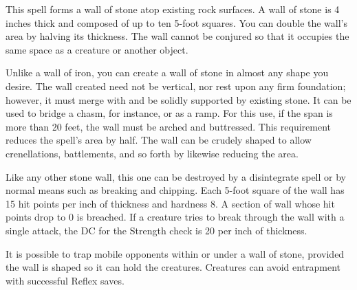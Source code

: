 \spellrng{\rngmed}
\begin{spelleffect}
  This spell forms a wall of stone atop existing rock surfaces. A wall of stone is 4 inches thick and composed of up to ten 5-foot squares. You can double the wall's area by halving its thickness. The wall cannot be conjured so that it occupies the same space as a creature or another object.
  \par Unlike a wall of iron, you can create a wall of stone in almost any shape you desire. The wall created need not be vertical, nor rest upon any firm foundation; however, it must merge with and be solidly supported by existing stone. It can be used to bridge a chasm, for instance, or as a ramp. For this use, if the span is more than 20 feet, the wall must be arched and buttressed. This requirement reduces the spell's area by half. The wall can be crudely shaped to allow crenellations, battlements, and so forth by likewise reducing the area.
  \par Like any other stone wall, this one can be destroyed by a disintegrate spell or by normal means such as breaking and chipping. Each 5-foot square of the wall has 15 hit points per inch of thickness and hardness 8. A section of wall whose hit points drop to 0 is breached. If a creature tries to break through the wall with a single attack, the DC for the Strength check is 20  per inch of thickness.
  \par It is possible to trap mobile opponents within or under a wall of stone, provided the wall is shaped so it can hold the creatures. Creatures can avoid entrapment with successful Reflex saves.
\end{spelleffect}

